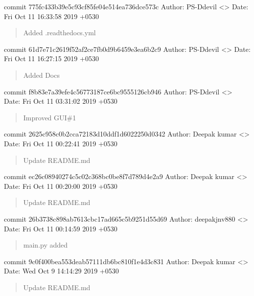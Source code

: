 \documentclass[letterpaper,10pt,english]{sphinxmanual}
\begin{document}
commit 775fc433b39e5c93cf85fe04e514ea736dce573c
Author: PS-Ddevil \textless{}\textgreater{}
Date:   Fri Oct 11 16:33:58 2019 +0530
\begin{quote}

Added .readthedocs.yml
\end{quote}

commit 61d7e71c2619f52af2ce7fb0d9b6459e3ea6b2c9
Author: PS-Ddevil \textless{}\textgreater{}
Date:   Fri Oct 11 16:27:15 2019 +0530
\begin{quote}

Added Docs
\end{quote}

commit f8b83e7a39efe4c56773187ce6bc9555126cb946
Author: PS-Ddevil \textless{}\textgreater{}
Date:   Fri Oct 11 03:31:02 2019 +0530
\begin{quote}

Improved GUI\#1
\end{quote}

commit 2625c958c0b2cca72183d10ddf1d6022250d0342
Author: Deepak kumar \textless{}\textgreater{}
Date:   Fri Oct 11 00:22:41 2019 +0530
\begin{quote}

Update README.md
\end{quote}

commit ec26c08940274c5c02c368bc0be8f7d789d4e2a9
Author: Deepak kumar \textless{}\textgreater{}
Date:   Fri Oct 11 00:20:00 2019 +0530
\begin{quote}

Update README.md
\end{quote}

commit 26b3738c898ab7613cbc17ad665c5b9251d55d69
Author: deepakjnv880 \textless{}\textgreater{}
Date:   Fri Oct 11 00:14:59 2019 +0530
\begin{quote}

main.py added
\end{quote}

commit 9c0f400bea553deab57111db6bc810f1e4d3c831
Author: Deepak kumar \textless{}\textgreater{}
Date:   Wed Oct 9 14:14:29 2019 +0530
\begin{quote}

Update README.md
\end{quote}
\end{document}

